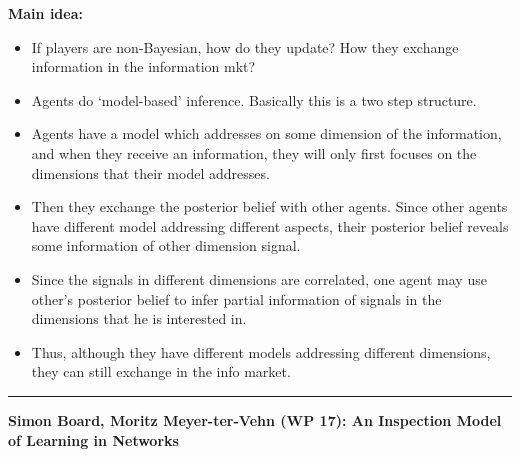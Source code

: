 \documentclass{book}
\theoremstyle{plain}
\theoremstyle{definition}
\newcommand{\myline}{\vspace{3mm} \hrule \vspace{4mm}}
\begin{document}
\noindent
\textbf{Main idea:}
\begin{itemize}
	\item If players are non-Bayesian, how do they update?
	How they exchange information in the information mkt?
	\item Agents do `model-based' inference.
	Basically this is a two step structure.
	\item Agents have a model which addresses on some dimension of the information,
	and when they receive an information, 
	they will only first focuses on the dimensions that their model addresses.
	\item Then they exchange the posterior belief with other agents.
	Since other agents have different model addressing different aspects,
	their posterior belief reveals some information of other dimension signal.
	\item Since the signals in different dimensions are correlated,
	one agent may use other's posterior belief to infer partial information of signals in the dimensions that he is interested in.
	\item Thus, although they have different models addressing different dimensions,
	they can still exchange in the info market.
\end{itemize}

\myline

\noindent
\textbf{Simon Board, Moritz Meyer-ter-Vehn (WP 17): An Inspection Model of Learning in Networks}\\
\end{document}
